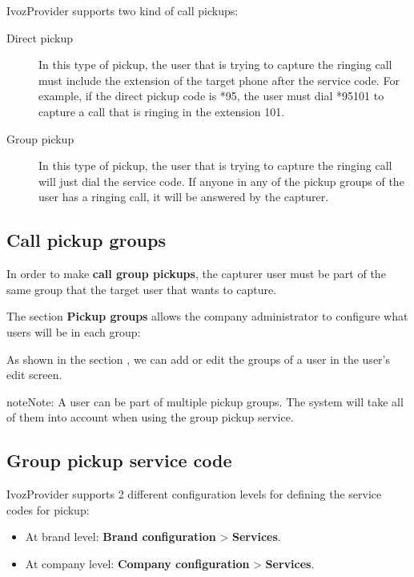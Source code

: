 \documentclass[letterpaper,10pt,english]{sphinxmanual}
\begin{document}
IvozProvider supports two kind of call pickups:
\begin{description}
\item[{Direct pickup}] \leavevmode{}\label{pbx_features/call_captures:term-direct-pickup}
In this type of pickup, the user that is trying to capture the ringing
call must include the extension of the target phone after the service
code. For example, if the direct pickup code is *95, the user must
dial *95101 to capture a call that is ringing in the extension 101.

\item[{Group pickup}] \leavevmode{}\label{pbx_features/call_captures:term-group-pickup}
In this type of pickup, the user that is trying to capture the ringing
call will just dial the service code. If anyone in any of the pickup
groups of the user has a ringing call, it will be answered by the
capturer.

\end{description}


\subsection{Call pickup groups}
\label{pbx_features/call_captures:call-pickup-groups}
In order to make \textbf{call group pickups}, the capturer user must be part of the
same group that the target user that wants to capture.

The section \textbf{Pickup groups} allows the company administrator to configure
what users will be in each group:

\noindent{}

As shown in the section {\hyperref[pbx_features/users:users]{}}, we can add or edit the groups of a user
in the user's edit screen.

\begin{notice}{note}{Note:}
A user can be part of multiple pickup groups. The system will take
all of them into account when using the group pickup service.
\end{notice}


\subsection{Group pickup service code}
\label{pbx_features/call_captures:group-pickup-service-code}
IvozProvider supports 2 different configuration levels for defining the service
codes for pickup:
\begin{itemize}
\item {} 
At brand level: \textbf{Brand configuration} \textgreater{} \textbf{Services}.

\item {} 
At company level: \textbf{Company configuration} \textgreater{} \textbf{Services}.

\end{itemize}
\end{document}
